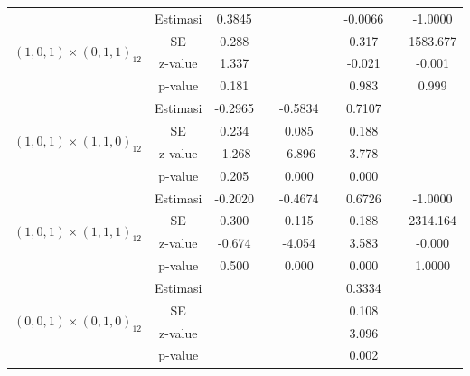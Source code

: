 \begin{enumerate}[label=\alph*.]
\begin{longtable}{|c|c|c|c|c|c|c|c|c|}
            \multirow{4}{*}{$(1,0,1)\times(0,1,1)_{12}$}
            & Estimasi & 0.3845  & {} & {} & {} & -0.0066 & {} & -1.0000\\ \cline{2-9}
            & SE       & 0.288 & {} & {} & {} & 0.317 & {} & 1583.677\\ \cline{2-9}
            & z-value  & 1.337  & {} & {} & {} & -0.021 & {}& -0.001\\ \cline{2-9}
            & p-value  & 0.181 & {} & {} & {} & 0.983 & {} & 0.999\\ \hline

            \multirow{4}{*}{$(1,0,1)\times(1,1,0)_{12}$}
            & Estimasi & -0.2965  & {} & -0.5834 & {} & 0.7107 & {} & {}\\ \cline{2-9}
            & SE       & 0.234 & {} & 0.085 & {} & 0.188 & {} & {}\\ \cline{2-9}
            & z-value  & -1.268  & {} & -6.896 & {} & 3.778 & {}& {}\\ \cline{2-9}
            & p-value  & 0.205 & {} & 0.000 & {} & 0.000 & {} & {}\\ \hline

            \multirow{4}{*}{$(1,0,1)\times(1,1,1)_{12}$}
            & Estimasi & -0.2020  & {} & -0.4674 & {} & 0.6726 & {} & -1.0000\\ \cline{2-9}
            & SE       & 0.300 & {} & 0.115  & {} & 0.188 & {} & 2314.164\\ \cline{2-9}
            & z-value  & -0.674  & {} & -4.054 & {} & 3.583  & {}& -0.000\\ \cline{2-9}
            & p-value  & 0.500  & {} & 0.000 & {} & 0.000 & {} & 1.0000\\ \hline

            \multirow{4}{*}{$(0,0,1)\times(0,1,0)_{12}$}
            & Estimasi & {} & {} & {} & {} & 0.3334 & {} & {}\\ \cline{2-9}
            & SE       & {} & {} & {} & {} & 0.108 & {} & {}\\ \cline{2-9}
            & z-value  & {} & {} & {} & {} & 3.096 & {}& {}\\ \cline{2-9}
            & p-value  & {} & {} & {} & {} & 0.002 & {} & {}\\ \hline


\end{longtable}
\end{enumerate}
